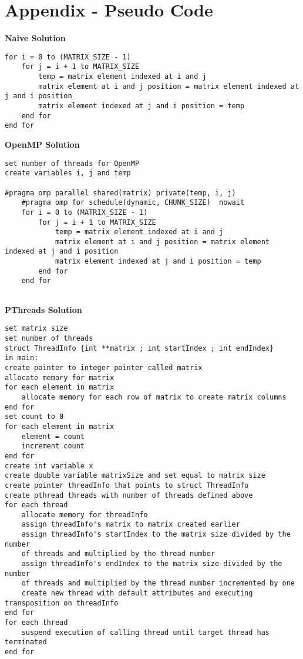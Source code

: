 \documentclass[10pt,onecolumn]{article}
\begin{document}
\newpage
\section*{Appendix - Pseudo Code}

\textbf{Naive Solution}
\begin{Verbatim}
for i = 0 to (MATRIX_SIZE - 1)
    for j = i + 1 to MATRIX_SIZE
        temp = matrix element indexed at i and j 
        matrix element at i and j position = matrix element indexed at j and i position
        matrix element indexed at j and i position = temp
    end for
end for
\end{Verbatim}

\textbf{OpenMP Solution}
\begin{Verbatim}
set number of threads for OpenMP
create variables i, j and temp

#pragma omp parallel shared(matrix) private(temp, i, j)
    #pragma omp for schedule(dynamic, CHUNK_SIZE)  nowait
    for i = 0 to (MATRIX_SIZE - 1)
    	for j = i + 1 to MATRIX_SIZE
    	    temp = matrix element indexed at i and j 
        	matrix element at i and j position = matrix element indexed at j and i position
        	matrix element indexed at j and i position = temp
        end for
    end for    
    

\end{Verbatim}
\textbf{PThreads Solution}
\begin{Verbatim}
set matrix size
set number of threads
struct ThreadInfo {int **matrix ; int startIndex ; int endIndex}
in main:
create pointer to integer pointer called matrix
allocate memory for matrix 
for each element in matrix
    allocate memory for each row of matrix to create matrix columns
end for
set count to 0
for each element in matrix
    element = count 
    increment count
end for
create int variable x
create double variable matrixSize and set equal to matrix size
create pointer threadInfo that points to struct ThreadInfo
create pthread threads with number of threads defined above
for each thread
    allocate memory for threadInfo
    assign threadInfo's matrix to matrix created earlier
    assign threadInfo's startIndex to the matrix size divided by the number
    of threads and multiplied by the thread number
    assign threadInfo's endIndex to the matrix size divided by the number 
    of threads and multiplied by the thread number incremented by one
    create new thread with default attributes and executing transposition on threadInfo
end for
for each thread 
	suspend execution of calling thread until target thread has terminated
end for


\end{Verbatim}
\end{document}
